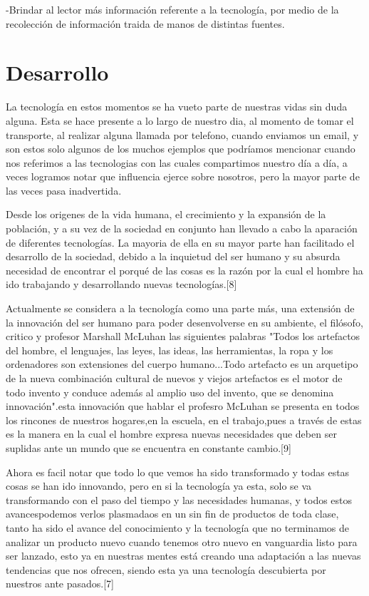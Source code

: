 \documentclass{bmcart}
\begin{document}
-Brindar al lector más información referente a la tecnología, por medio de la recolección de información traida de manos de distintas fuentes.

\section*{Desarrollo}
La tecnología en estos momentos se ha vueto parte de nuestras vidas sin duda alguna. Esta se hace presente a lo largo de nuestro dia, al momento de tomar el transporte, al realizar alguna llamada por telefono, cuando enviamos un email, y son estos solo algunos de los muchos ejemplos que podríamos mencionar cuando nos referimos a las tecnologias con las cuales compartimos nuestro día a día, a veces logramos notar que influencia ejerce sobre nosotros, pero la mayor parte de las veces pasa inadvertida.\smallskip

Desde los origenes de la vida humana, el crecimiento y la expansión de la población, y a su vez de la sociedad en conjunto han llevado a cabo la aparación de diferentes tecnologías. La mayoria de ella en  su mayor parte han facilitado el desarrollo de la sociedad, debido a la inquietud del ser humano y su absurda necesidad de encontrar el porqué de las cosas es la razón por la cual el hombre ha ido trabajando y desarrollando nuevas tecnologías.[8]\smallskip

Actualmente se considera a la tecnología como una parte más, una extensión de la innovación del ser humano para poder desenvolverse en su ambiente, el filósofo, critico y profesor Marshall McLuhan las siguientes palabras "Todos los artefactos del hombre, el lenguajes, las leyes, las ideas, las herramientas, la ropa y los ordenadores son extensiones del cuerpo humano...Todo artefacto es un arquetipo de la nueva combinación cultural de nuevos y viejos artefactos es el motor de todo invento y conduce además al amplio uso del invento, que se denomina innovación".esta innovación que hablar el profesro McLuhan se presenta en todos los rincones de nuestros hogares,en la escuela, en el trabajo,pues a través de estas es la manera en la cual el hombre expresa nuevas necesidades que deben ser suplidas ante un mundo que se encuentra en constante cambio.[9]\smallskip 

Ahora es facil notar que todo lo que vemos ha sido transformado y todas estas cosas se han ido innovando, pero en si la tecnología ya esta, solo se va transformando con el paso del tiempo y las necesidades humanas, y todos estos avancespodemos verlos plasmadaos en un sin fin de productos de toda clase, tanto ha sido el avance del conocimiento y la tecnología que no terminamos de analizar un producto nuevo cuando tenemos otro nuevo en vanguardia  listo para ser lanzado, esto ya en nuestras mentes está creando una adaptación a las nuevas tendencias que nos ofrecen, siendo esta ya una tecnología descubierta por nuestros ante pasados.[7]\smallskip
\end{document}
